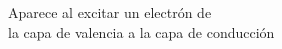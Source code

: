 \documentclass[preview]{standalone}
\begin{document}
\begin{center}
Aparece al excitar un electrón de \\ la capa de valencia a la capa de conducción
\end{center}
\end{document}
